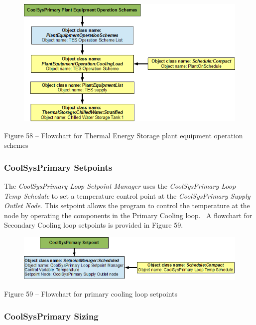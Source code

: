 \begin{figure}[htbp]
\centering
\includegraphics{media/image058.png}
\caption{}
\end{figure}

Figure 58 -- Flowchart for Thermal Energy Storage plant equipment operation schemes

\subsubsection{CoolSysPrimary Setpoints}\label{coolsysprimary-setpoints}

The \emph{CoolSysPrimary Loop Setpoint Manager} uses the \emph{CoolSysPrimary Loop Temp Schedule} to set a temperature control point at the \emph{CoolSysPrimary Supply Outlet Node}. This setpoint allows the program to control the temperature at the node by operating the components in the Primary Cooling loop. ~A flowchart for Secondary Cooling loop setpoints is provided in Figure 59.

\begin{figure}[htbp]
\centering
\includegraphics{media/image059.png}
\caption{}
\end{figure}

Figure 59 -- Flowchart for primary cooling loop setpoints

\subsubsection{CoolSysPrimary Sizing}\label{coolsysprimary-sizing}

